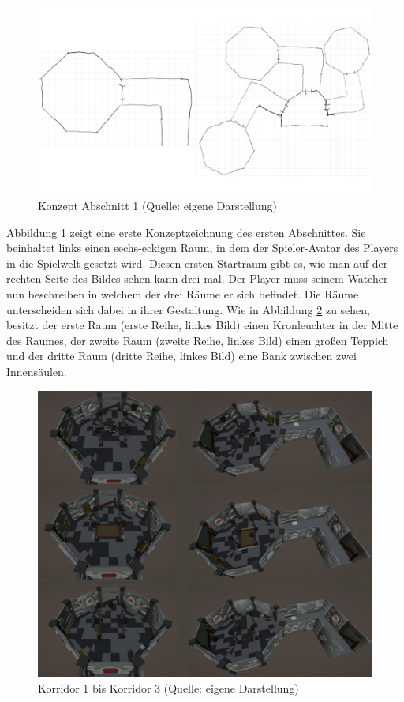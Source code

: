 \begin{figure}[ht]
\centering
\includegraphics[width=1\linewidth]{content/pictures/Abschnitt_Concept_00.png}
\caption{Konzept Abschnitt 1 (Quelle: eigene Darstellung)}
\label{fig:section_00_concept}
\end{figure}

Abbildung \ref{fig:section_00_concept} zeigt eine erste Konzeptzeichnung des ersten Abschnittes. Sie beinhaltet links einen sechs-eckigen Raum, in dem der Spieler-Avatar des Players in die Spielwelt gesetzt wird. Diesen ersten Startraum gibt es, wie man auf der rechten Seite des Bildes sehen kann drei mal. Der Player muss seinem Watcher nun beschreiben in welchem der drei Räume er sich befindet. Die Räume unterscheiden sich dabei in ihrer Gestaltung. Wie in Abbildung \ref{fig:corridors} zu sehen, besitzt der erste Raum (erste Reihe, linkes Bild) einen Kronleuchter in der Mitte des Raumes, der zweite Raum (zweite Reihe, linkes Bild) einen großen Teppich und der dritte Raum (dritte Reihe, linkes Bild) eine Bank zwischen zwei Innensäulen.

\begin{figure}[ht]
\centering
\includegraphics[width=1\linewidth]{content/pictures/Room_00-Room_02-Corridor_00-Corridor_02.png}
\caption{Korridor 1 bis Korridor 3 (Quelle: eigene Darstellung)}
\label{fig:corridors}
\end{figure}

